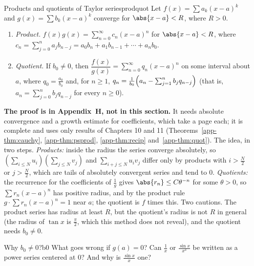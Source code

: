 \documentclass[11pt]{article}
\begin{document}
\begin{thm}{Products and quotients of Taylor series}{prodquot}
Let $f(x)=\sum a_k(x-a)^k$ and $g(x)=\sum b_k(x-a)^k$ converge for $\abs{x-a}<R$, where $R>0$.
\begin{enumerate}
  \item \emph{Product.} $f(x)g(x)=\sum_{n=0}^\infty c_n(x-a)^n$ for $\abs{x-a}<R$, where $c_n=\sum_{j=0}^na_jb_{n-j}=a_0b_n+a_1b_{n-1}+\cdots+a_nb_0$.
  \item \emph{Quotient.} If $b_0\ne0$, then $\dfrac{f(x)}{g(x)}=\sum_{n=0}^\infty q_n(x-a)^n$ on some interval about $a$, where $q_0=\frac{a_0}{b_0}$ and, for $n\ge1$, $q_n=\frac1{b_0}\Bigl(a_n-\sum_{j=1}^nb_jq_{n-j}\Bigr)$ (that is, $a_n=\sum_{j=0}^nb_jq_{n-j}$ for every $n\ge0$).
\end{enumerate}
\end{thm}
\textbf{The proof is in Appendix~H, not in this section.} It needs absolute convergence and a growth estimate for coefficients, which take a page each; it is complete and uses only results of Chapters 10 and 11 (Theorems~\ref{app-thm:cauchy}, \ref{app-thm:psprod}, \ref{app-thm:recip} and~\ref{app-thm:quot}). The idea, in two steps. \emph{Products:} inside the radius the series converge absolutely, so $\left(\sum_{i\le N}u_i\right)\left(\sum_{j\le N}v_j\right)$ and $\sum_{i+j\le N}u_iv_j$ differ only by products with $i>\frac N2$ or $j>\frac N2$, which are tails of absolutely convergent series and tend to $0$. \emph{Quotients:} the recurrence for the coefficients of $\frac1g$ gives $\abs{r_n}\le C\theta^{-n}$ for some $\theta>0$, so $\sum r_n(x-a)^n$ has positive radius, and by the product rule $g\cdot\sum r_n(x-a)^n=1$ near $a$; the quotient is $f$ times this. Two cautions. The product series has radius at least $R$, but the quotient's radius is not $R$ in general (the radius of $\tan x$ is $\frac\pi2$, which this method does not reveal), and the quotient needs $b_0\ne0$.

\begin{think}{Why $b_0\ne0$?}{b0}
What goes wrong if $g(a)=0$? Can $\frac{1}{x}$ or $\frac{\sin x}{x^3}$ be written as a power series centered at $0$? And why is $\frac{\sin x}x$ one?
\end{think}
\end{document}
